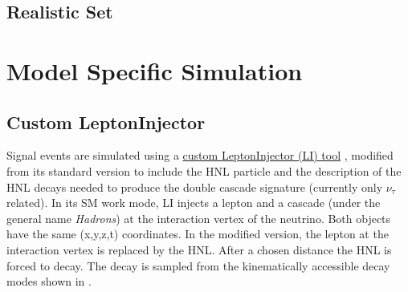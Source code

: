 


\subsection{Realistic Set}



\section{Model Specific Simulation} 



\subsection{Custom LeptonInjector} 

Signal events are simulated using a \href{https://github.com/LeanderFischer/LeptonInjector-HNL/tree/main/LeptonInjector}{custom LeptonInjector (LI) tool} , modified from its standard version to include the HNL particle and the description of the HNL decays needed to produce the double cascade signature (currently only $\nu_{\tau}$ related). In its SM work mode, LI injects a lepton and a cascade (under the general name \textit{Hadrons}) at the interaction vertex of the neutrino. Both objects have the same (x,y,z,t) coordinates. In the modified version, the lepton at the interaction vertex is replaced by the HNL. After a chosen distance the HNL is forced to decay. The decay is sampled from the kinematically accessible decay modes shown in .

